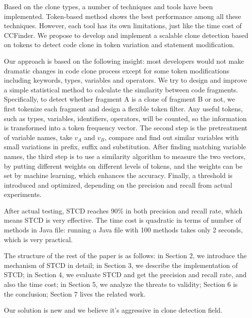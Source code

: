 \documentclass[../main.tex]{subfiles}
\begin{document}


Based on the clone types, a number of techniques and tools have been implemented. Token-based method shows the best performance among all these techniques. However, each tool has its own limitations, just like the time cost of CCFinder. We propose to develop and implement a scalable clone detection based on tokens to detect code clone in token variation and statement modification.

Our approach is based on the following insight: most developers would not make dramatic changes in code clone process except for some token modifications including keywords, types, variables and operators. 
We try to design and improve a simple statistical method to calculate the similarity between code fragments. 
Specifically, to detect whether fragment A is a clone of fragment B or not, we first tokenize each fragment and design a flexible token filter. Any useful tokens, such as types, variables, identifiers, operators, will be counted, so the information is transformed into a token frequency vector. 
The second step is the pretreatment of variable names, take $v_A$ and $v_B$, compare and find out similar variables with small variations in prefix, suffix and substitution. 
After finding matching variable names, the third step is to use a similarity algorithm to measure the two vectors, by putting different weights on different levels of tokens, and the weights can be set by machine learning, which enhances the accuracy.
Finally, a threshold is introduced and optimized, depending on the precision and recall from actual experiments.

After actual testing, STCD reaches 90\% in both precision and recall rate, which means STCD is very effective. The time cost is quadratic in terms of number of methods in Java file: running a Java file with 100 methods takes only 2 seconds, which is very practical.

The structure of the rest of the paper is as follows: in Section 2, we introduce the mechanism of STCD in detail; in Section 3, we describe the implementation of STCD; in Section 4, we evaluate STCD and get the precision and recall rate, and also the time cost; in Section 5, we analyze the threats to validity; Section 6 is the conclusion; Section 7 lives the related work. 

%

Our solution is new and we believe it's aggressive in clone detection field.
\end{document}
